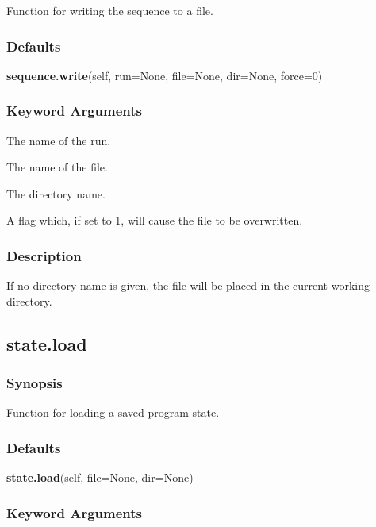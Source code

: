  Function for writing the sequence to a file. 
  

  
 \subsubsection{Defaults} 

 \textsf{\textbf{sequence.write}(self, run=None, file=None, dir=None, force=0)} 

  
 \subsubsection{Keyword Arguments} 

   The name of the run.   

   The name of the file.   

   The directory name.   

   A flag which, if set to 1, will cause the file to be overwritten.  

  

  
 \subsubsection{Description} 

 If no directory name is given, the file will be placed in the current working directory. 
  

  

 \newpage 

 \subsection{state.load} 

  
 \subsubsection{Synopsis} 

 Function for loading a saved program state. 
  

  
 \subsubsection{Defaults} 

 \textsf{\textbf{state.load}(self, file=None, dir=None)} 

  
 \subsubsection{Keyword Arguments} 

